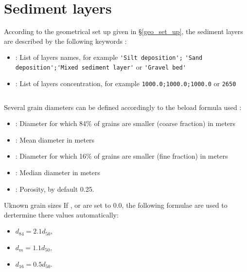 \section{Sediment layers}

According to the geometrical set up given in \S \ref{geo_set_up}, the sediment layers are described by the following keywords :
\begin{itemize}
	\item {} : List of layers names, for example \verb|'Silt deposition';| \verb|'Sand deposition';'Mixed sediment layer'| or \verb|'Gravel bed'|
	\item {} : List of layers concentration, for example \verb|1000.0;|\verb|1000.0;1000.0| or \verb|2650|
\end{itemize}

\subsection{\Cbedload}
Several grain diameters can be defined accordingly to the beload formula used :
\begin{itemize}
	\item {} : Diameter for which 84\% of grains are smaller (coarse fraction) in meters
	\item {} : Mean diameter in meters
	\item {} : Diameter for which 16\% of grains are smaller (fine fraction) in meters
	\item {} : Median diameter in meters
	\item {} : Porosity, by default 0.25.
\end{itemize}

\begin{CommentBlock}{Uknown grain sizes}
  If ,  or  are set to 0.0, the following formulae are used to dertermine there values automatically:
  \begin{itemize}
    \item $d_{84}=2.1 d_{50}$,
    \item $d_{m}=1.1 d_{50}$,
    \item $d_{16}=0.5 d_{50}$.
  \end{itemize}
\end{CommentBlock}

